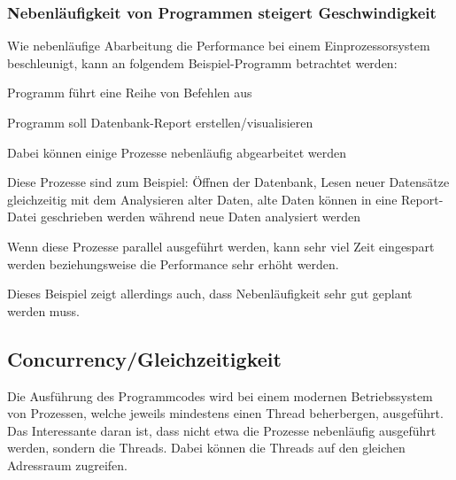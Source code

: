 \subsubsection{Nebenläufigkeit von Programmen steigert Geschwindigkeit}
Wie nebenläufige Abarbeitung die Performance bei einem Einprozessorsystem beschleunigt, kann an folgendem Beispiel-Programm betrachtet werden:
 
\begin{compactitem}
    \item Programm führt eine Reihe von Befehlen aus
    \item Programm soll Datenbank-Report erstellen/visualisieren    
    \item Dabei können einige Prozesse nebenläufig abgearbeitet werden
    \item Diese Prozesse sind zum Beispiel: Öffnen der Datenbank, Lesen neuer Datensätze gleichzeitig mit dem Analysieren alter Daten, alte Daten können in eine Report-Datei geschrieben werden während neue Daten analysiert werden
    \item Wenn diese Prozesse parallel ausgeführt werden, kann sehr viel Zeit eingespart werden beziehungsweise die Performance sehr erhöht werden.
    \item Dieses Beispiel zeigt allerdings auch, dass Nebenläufigkeit sehr gut geplant werden muss.
\end{compactitem}
\cite{javaInselBuch}
 
 
\subsection{Concurrency/Gleichzeitigkeit}
Die Ausführung des Programmcodes wird bei einem modernen Betriebssystem von Prozessen, welche jeweils mindestens einen Thread beherbergen, ausgeführt. Das Interessante daran ist, dass nicht etwa die Prozesse nebenläufig ausgeführt werden, sondern die Threads. Dabei können die Threads auf den gleichen Adressraum zugreifen. \cite{javaInselBuch}
 
